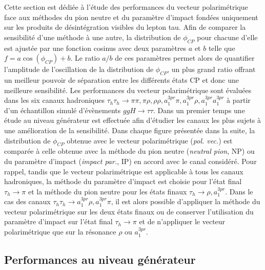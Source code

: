 Cette section est dédiée à l'étude des performances du vecteur polarimétrique face aux méthodes du pion neutre et du paramètre d'impact fondées uniquement sur les produits de désintégration visibles du lepton tau. Afin de comparer la sensibilité d'une méthode à une autre, la distribution de $\phi_{CP}$ pour chacune d'elle est ajustée par une fonction cosinus avec deux paramètres $a$ et $b$ telle que $f = a\cos(\phi_{CP})+b$. Le ratio $a/b$ de ces paramètres permet alors de quantifier l'amplitude de l'oscillation de la distribution de $\phi_{CP}$, un plus grand ratio offrant un meilleur pouvoir de séparation entre les différents états CP et donc une meilleure sensibilité. Les performances du vecteur polarimétrique sont évaluées dans les six canaux hadroniques $\tau_h\tau_h\rightarrow\pi\pi,\pi\rho,\rho\rho,a_1^{3pr}\pi,a_1^{3pr}\rho,a_1^{3pr}a_1^{3pr}$ à partir d'un échantillon simulé d'évènements $ggH\to\tau\tau$. Dans un premier temps une étude au niveau générateur est effectuée afin d'étudier les canaux les plus sujets à une amélioration de la sensibilité. Dans chaque figure présentée dans la suite, la distribution de $\phi_{CP}$ obtenue avec le vecteur polarimétrique (\textit{pol. vec.}) est comparée à celle obtenue avec la méthode du pion neutre (\textit{neutral pion}, NP) ou du paramètre d'impact (\textit{impact par.}, IP) en accord avec le canal considéré. Pour rappel, tandis que le vecteur polarimétrique est applicable à tous les canaux hadroniques, la méthode du paramètre d'impact est choisie pour l'état final $\tau_h\rightarrow\pi$ et la méthode du pion neutre pour les états finaux $\tau_h\rightarrow\rho,a_1^{3pr}$. Dans le cas des canaux $\tau_h\tau_h\rightarrow a_1^{3pr}\rho,a_1^{3pr}\pi$, il est alors possible d'appliquer la méthode du vecteur polarimétrique sur les deux états finaux ou de conserver l'utilisation du paramètre d'impact sur l'état final $\tau_h\rightarrow\pi$ et de n'appliquer le vecteur polarimétrique que sur la résonance $\rho$ ou $a_1^{3pr}$. \\

\subsection{Performances au niveau générateur}

